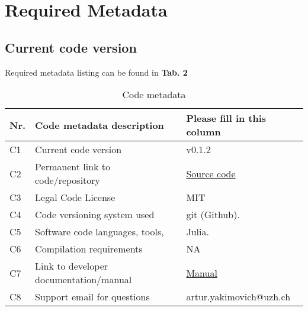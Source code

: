 \section{Required Metadata}

\subsection{Current code version}

Required metadata listing can be found in \textbf{Tab. 2}

\begin{table}
\begin{tabular}{lll}
\hline
\textbf{Nr.} & \textbf{Code metadata description} & \textbf{Please fill in this column} \\
\hline
C1 & Current code version & v0.1.2 \\
\hline
C2 & Permanent link to code/repository & \href{https://github.com/MatlabCompat/MatlabCompat.jl}{Source code} \\
\hline
C3 & Legal Code License   & MIT \\
\hline
C4 & Code versioning system used & git (Github). \\
\hline
C5 & Software code languages, tools, & Julia. \\
\hline
C6 & Compilation requirements & NA \\
\hline
C7 & Link to developer documentation/manual & \href{http://matlabcompat.github.io/help.html}{Manual}\\
\hline
C8 & Support email for questions & artur.yakimovich@uzh.ch\\
\hline
\end{tabular}
\caption{Code metadata}
\end{table}
  